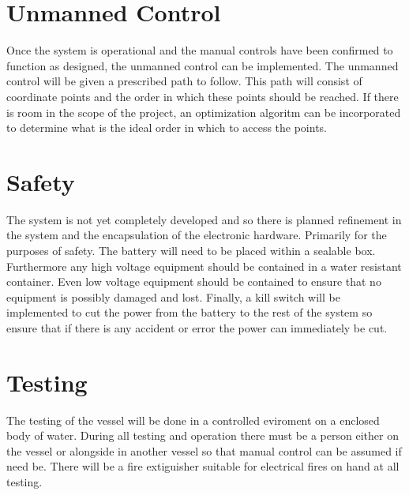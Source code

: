 \section{Unmanned Control}
Once the system is operational and the manual controls have been confirmed to function as designed, the unmanned control can be implemented. The unmanned control will be given a prescribed path to follow. This path will consist of coordinate points and the order in which these points should be reached. If there is room in the scope of the project, an optimization algoritm can be incorporated to determine what is the ideal order in which to access the points.
\section{Safety}
The system is not yet completely developed and so there is planned refinement in the system and the encapsulation of the electronic hardware. Primarily for the purposes of safety. The battery will need to be placed within a sealable box. Furthermore any high voltage equipment should be contained in a water resistant container. Even low voltage equipment should be contained to ensure that no equipment is possibly damaged and lost. Finally, a kill switch will be implemented to cut the power from the battery to the rest of the system so ensure that if there is any accident or error the power can immediately be cut.
\section{Testing}
The testing of the vessel will be done in a controlled eviroment on a enclosed body of water. During all testing and operation there must be a person either on the vessel or alongside in another vessel so that manual control can be assumed if need be. There will be a fire extiguisher suitable for electrical fires on hand at all testing.
